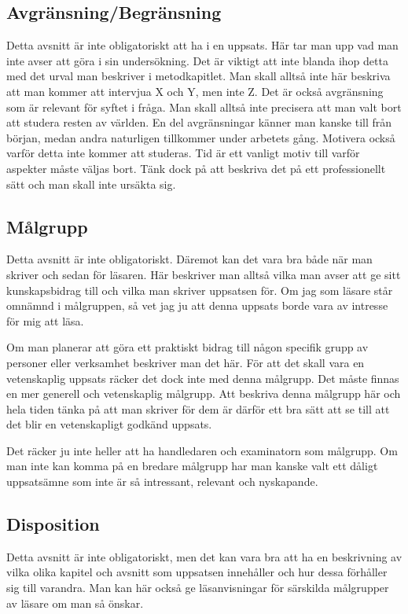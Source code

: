 \documentclass[a4paper,12pt]{article} %
\begin{document}
\subsection{Avgränsning/Begränsning}
Detta avsnitt är inte obligatoriskt att ha i en uppsats. Här tar man upp vad man inte avser att göra i sin undersökning. Det är viktigt att inte blanda ihop detta med det urval man beskriver i metodkapitlet. Man skall alltså inte här beskriva att man kommer att intervjua X och Y, men inte Z. Det är också avgränsning som är relevant för syftet i fråga. Man skall alltså inte precisera att man valt bort att studera resten av världen. En del avgränsningar känner man kanske till från början, medan andra naturligen tillkommer under arbetets gång. Motivera också varför detta inte kommer att studeras. Tid är ett vanligt motiv till varför aspekter måste väljas bort. Tänk dock på att beskriva det på ett professionellt sätt och man skall inte ursäkta sig.

\subsection{ Målgrupp}
Detta avsnitt är inte obligatoriskt. Däremot kan det vara bra både när man skriver och sedan för läsaren. Här beskriver man alltså vilka man avser att ge sitt kunskapsbidrag till och vilka man skriver uppsatsen för. Om jag som läsare står omnämnd i målgruppen, så vet jag ju att denna uppsats borde vara av intresse för mig att läsa.

Om man planerar att göra ett praktiskt bidrag till någon specifik grupp av personer eller verksamhet beskriver man det här. För att det skall vara en vetenskaplig uppsats räcker det dock inte med denna målgrupp. Det måste finnas en mer generell och vetenskaplig målgrupp. Att beskriva denna målgrupp här och hela tiden tänka på att man skriver för dem är därför ett bra sätt att se till att det blir en vetenskapligt godkänd uppsats.

Det räcker ju inte heller att ha handledaren och examinatorn som målgrupp. Om man inte kan komma på en bredare målgrupp har man kanske valt ett dåligt uppsatsämne som inte är så intressant, relevant och nyskapande.

\subsection{Disposition}
Detta avsnitt är inte obligatoriskt, men det kan vara bra att ha en beskrivning av vilka olika kapitel och avsnitt som uppsatsen innehåller och hur dessa förhåller sig till varandra. Man kan här också ge läsanvisningar för särskilda målgrupper av läsare om man så önskar.
\end{document}
